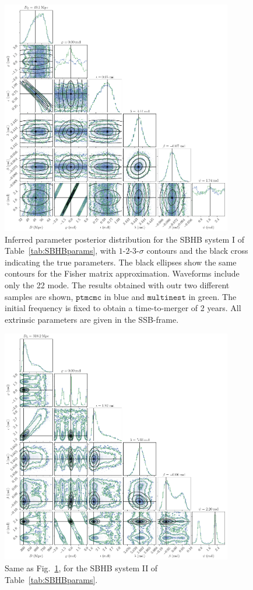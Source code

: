 \documentclass[aps,showpacs,twocolumn,prd,superscriptaddress,nofootinbib]{revtex4-1}
\begin{document}
\begin{figure}
	\includegraphics[width=0.9\textwidth]{corner_sobh_tdc1_extr_ptmcmc_bambi}
	\caption{Inferred parameter posterior distribution for the SBHB system I of Table~\ref{tab:SBHBparams}, with $1$-$2$-$3$-$\sigma$ contours and the black cross indicating the true parameters. The black ellipses show the same contours for the Fisher matrix approximation. Waveforms include only the 22 mode. The results obtained with outr two different samples are shown, $\texttt{ptmcmc}$ in blue and $\texttt{multinest}$ in green. The initial frequency is fixed to obtain a time-to-merger of 2 years. All extrinsic parameters are given in the SSB-frame.}
	\label{fig:sbhb_corner_1}
\end{figure}

\begin{figure}
	\includegraphics[width=0.9\textwidth]{corner_sobh_tdc2_extr_ptmcmc_bambi}
	\caption{Same as Fig.~\ref{fig:sbhb_corner_1}, for the SBHB system II of Table~\ref{tab:SBHBparams}.}
	\label{fig:sbhb_corner_12}
\end{figure}
\end{document}

